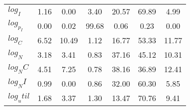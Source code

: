 \begin{center}
\begin{longtable}{lcccccc}
$log_I     $	 & 	        1.16	 & 	        0.00	 & 	        3.40	 & 	       20.57	 & 	       69.89	 & 	        4.99 \\ 
$log_p_I   $	 & 	        0.00	 & 	        0.02	 & 	       99.68	 & 	        0.06	 & 	        0.23	 & 	        0.00 \\ 
$log_C     $	 & 	        6.52	 & 	       10.49	 & 	        1.12	 & 	       16.77	 & 	       53.33	 & 	       11.77 \\ 
$log_N     $	 & 	        3.18	 & 	        3.41	 & 	        0.83	 & 	       37.16	 & 	       45.12	 & 	       10.31 \\ 
$log_NC    $	 & 	        4.51	 & 	        7.25	 & 	        0.78	 & 	       38.16	 & 	       36.89	 & 	       12.41 \\ 
$log_NI    $	 & 	        0.99	 & 	        0.00	 & 	        0.86	 & 	       32.00	 & 	       60.30	 & 	        5.85 \\ 
$log_util  $	 & 	        1.68	 & 	        3.37	 & 	        1.30	 & 	       13.47	 & 	       70.76	 & 	        9.41 \\ 
\end{longtable}
 \end{center}
